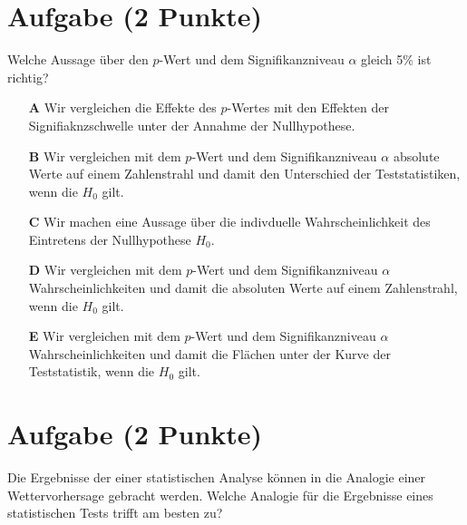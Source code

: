 \documentclass[a4paper, 9pt]{scrartcl}\usepackage[]{graphicx}\usepackage[]{xcolor}
\begin{document}
\section{Aufgabe \hfill (2 Punkte)}

Welche Aussage über den $p$-Wert und dem Signifikanzniveau $\alpha$ gleich 5\% ist richtig?



\begin{enumerate}
\item [\textbf{A} \msquare] Wir vergleichen die Effekte des $p$-Wertes mit den Effekten der Signifiaknzschwelle unter der Annahme der Nullhypothese.
\item [\textbf{B} \msquare] Wir vergleichen mit dem $p$-Wert und dem Signifikanzniveau $\alpha$ absolute Werte auf einem Zahlenstrahl und damit den Unterschied der Teststatistiken, wenn die $H_0$ gilt.
\item [\textbf{C} \msquare] Wir machen eine Aussage über die indivduelle Wahrscheinlichkeit des Eintretens der Nullhypothese $H_0$.
\item [\textbf{D} \msquare] Wir vergleichen mit dem $p$-Wert und dem Signifikanzniveau $\alpha$ Wahrscheinlichkeiten und damit die absoluten Werte auf einem Zahlenstrahl, wenn die $H_0$ gilt.
\item [\textbf{E} \msquare] Wir vergleichen mit dem $p$-Wert und dem Signifikanzniveau $\alpha$ Wahrscheinlichkeiten und damit die Flächen unter der Kurve der Teststatistik, wenn die $H_0$ gilt.
\end{enumerate}

\section{Aufgabe \hfill (2 Punkte)}



Die Ergebnisse der einer statistischen Analyse k{\"o}nnen in die Analogie einer
Wettervorhersage gebracht werden. Welche Analogie f{\"u}r die
Ergebnisse eines statistischen Tests trifft am besten zu?
\end{document}
